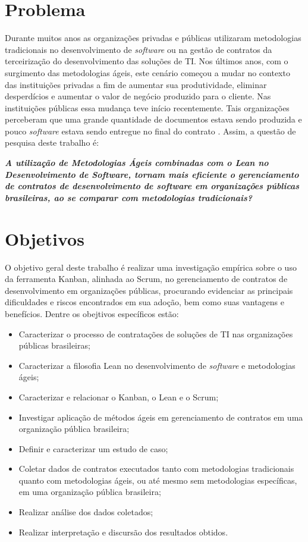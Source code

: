 \section[Problema]{Problema}

Durante muitos anos as organizações privadas e públicas utilizaram metodologias tradicionais no desenvolvimento de \textit{software} ou na gestão de contratos da terceirização do desenvolvimento das soluções de TI. Nos últimos anos, com o surgimento das metodologias ágeis, este cenário começou a mudar no contexto das instituições privadas a fim de aumentar sua produtividade, eliminar desperdícios e aumentar o valor de negócio produzido para o cliente. Nas instituições públicas essa mudança teve início recentemente. Tais organizações perceberam que uma grande quantidade de documentos estava sendo produzida e pouco \textit{software} estava sendo entregue no final do contrato \cite{TCU:2013}. Assim, a questão de pesquisa deste trabalho é:

\textit{\textbf {A utilização de Metodologias Ágeis combinadas com o Lean no Desenvolvimento de \textit{Software}, tornam mais eficiente o gerenciamento de contratos de desenvolvimento de \textit{software} em organizações públicas brasileiras, ao se comparar com metodologias tradicionais?}}

\section[Objetivos]{Objetivos}

O objetivo geral deste trabalho é realizar uma investigação empírica sobre o uso da ferramenta Kanban, alinhada ao Scrum, no gerenciamento de contratos de desenvolvimento em organizações públicas, procurando evidenciar as principais dificuldades e riscos encontrados em sua adoção, bem como suas vantagens e benefícios. Dentre os obejtivos específicos estão:

\begin{itemize}
\item Caracterizar o processo de contratações de soluções de TI nas organizações públicas brasileiras;
\item Caracterizar a filosofia Lean no desenvolvimento de \textit{software} e metodologias ágeis;
\item Caracterizar e relacionar o Kanban, o Lean e o Scrum;
\item Investigar aplicação de métodos ágeis em gerenciamento de contratos em uma organização pública brasileira;
\item Definir e caracterizar um estudo de caso;
\item Coletar dados de contratos executados tanto com metodologias tradicionais quanto com metodologias ágeis, ou até mesmo sem metodologias específicas, em uma organização pública brasileira;
\item Realizar análise dos dados coletados;
\item Realizar interpretação e discursão dos resultados obtidos.
\end{itemize}

